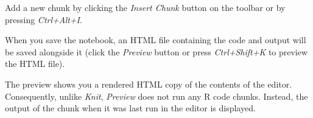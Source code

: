 \documentclass[]{article}
\begin{document}
Add a new chunk by clicking the \emph{Insert Chunk} button on the
toolbar or by pressing \emph{Ctrl+Alt+I}.

When you save the notebook, an HTML file containing the code and output
will be saved alongside it (click the \emph{Preview} button or press
\emph{Ctrl+Shift+K} to preview the HTML file).

The preview shows you a rendered HTML copy of the contents of the
editor. Consequently, unlike \emph{Knit}, \emph{Preview} does not run
any R code chunks. Instead, the output of the chunk when it was last run
in the editor is displayed.
\end{document}

